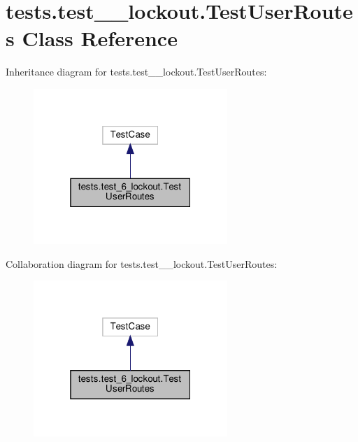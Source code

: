 \hypertarget{classtests_1_1test__6__lockout_1_1_test_user_routes}{}\section{tests.\+test\+\_\+\_\+lockout.\+Test\+User\+Routes Class Reference}
\label{classtests_1_1test__6__lockout_1_1_test_user_routes}


Inheritance diagram for tests.\+test\+\_\+\_\+lockout.\+Test\+User\+Routes\+:\nopagebreak
\begin{figure}[H]
\begin{center}
\leavevmode
\includegraphics[width=208pt]{classtests_1_1test__6__lockout_1_1_test_user_routes__inherit__graph}
\end{center}
\end{figure}


Collaboration diagram for tests.\+test\+\_\+\_\+lockout.\+Test\+User\+Routes\+:\nopagebreak
\begin{figure}[H]
\begin{center}
\leavevmode
\includegraphics[width=208pt]{classtests_1_1test__6__lockout_1_1_test_user_routes__coll__graph}
\end{center}
\end{figure}
